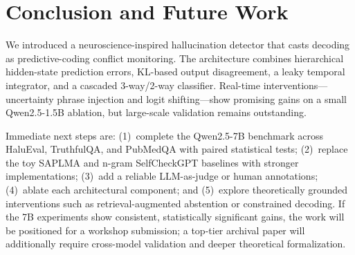 \documentclass[letterpaper]{article}
\begin{document}
\section{Conclusion and Future Work}

We introduced a neuroscience-inspired hallucination detector that casts decoding as predictive-coding conflict monitoring. The architecture combines hierarchical hidden-state prediction errors, KL-based output disagreement, a leaky temporal integrator, and a cascaded 3-way/2-way classifier. Real-time interventions---uncertainty phrase injection and logit shifting---show promising gains on a small Qwen2.5-1.5B ablation, but large-scale validation remains outstanding.

Immediate next steps are: (1)~complete the Qwen2.5-7B benchmark across HaluEval, TruthfulQA, and PubMedQA with paired statistical tests; (2)~replace the toy SAPLMA and n-gram SelfCheckGPT baselines with stronger implementations; (3)~add a reliable LLM-as-judge or human annotations; (4)~ablate each architectural component; and (5)~explore theoretically grounded interventions such as retrieval-augmented abstention or constrained decoding. If the 7B experiments show consistent, statistically significant gains, the work will be positioned for a workshop submission; a top-tier archival paper will additionally require cross-model validation and deeper theoretical formalization.



\end{document}
